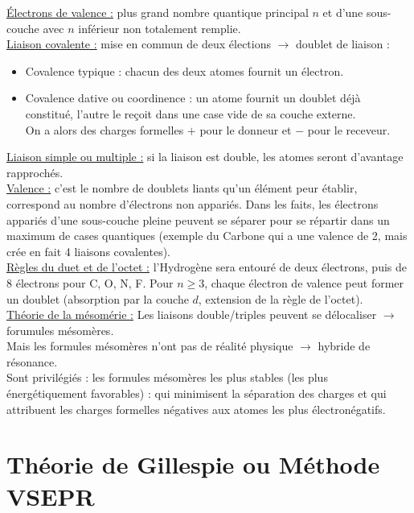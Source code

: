 \documentclass[13pt, twoside, a4paper, french, tikz]{report}
\begin{document}
    \underline{Électrons de valence :} plus grand nombre quantique principal $n$ et d'une sous-couche avec $n$ inférieur non totalement remplie.\\
    
    \underline{Liaison covalente :} mise en commun de deux élections $\rightarrow$ doublet de liaison :
    \begin{itemize}
      \item Covalence typique : chacun des deux atomes fournit un électron.
      \item Covalence dative ou coordinence : un atome fournit un doublet déjà constitué, l'autre le reçoit dans une case vide de sa couche externe.\\
      On a alors des charges formelles $+$ pour le donneur et $-$ pour le receveur.\\
    \end{itemize}
    
    \underline{Liaison simple ou multiple :} si la liaison est double, les atomes seront d'avantage rapprochés.\\
    
    \underline{Valence :} c'est le nombre de doublets liants qu'un élément peur établir, correspond au nombre d'électrons non appariés.
    Dans les faits, les électrons appariés d'une sous-couche pleine peuvent se séparer pour se répartir dans un maximum de cases quantiques (exemple du Carbone qui a une valence de 2, mais crée en fait 4 liaisons covalentes).\\
    
    \underline{Règles du duet et de l'octet :} l'Hydrogène sera entouré de deux électrons, puis de 8 électrons pour C, O, N, F.
    Pour $n \ge 3$, chaque électron de valence peut former un doublet (absorption par la couche $d$, extension de la règle de l'octet).\\
    
    \underline{Théorie de la mésomérie :} Les liaisons double/triples peuvent se délocaliser $\rightarrow$ forumules mésomères.\\
    Mais les formules mésomères n'ont pas de réalité physique $\rightarrow$ hybride de résonance.\\
    Sont privilégiés : les formules mésomères les plus stables (les plus énergétiquement favorables) : qui minimisent la séparation des charges et qui attribuent les charges formelles négatives aux atomes les plus électronégatifs.
  
  
  \section{Théorie de Gillespie ou Méthode VSEPR}\label{sec:theorie-de-gillespie-ou-methode-vsepr}
    
\end{document}
